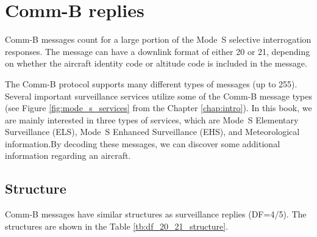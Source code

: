 \chapter{Comm-B replies} \label{chap:comm-b}

Comm-B messages count for a large portion of the Mode~S selective interrogation responses. The message can have a downlink format of either 20 or 21, depending on whether the aircraft identity code or altitude code is included in the message.

The Comm-B protocol supports many different types of messages (up to 255). Several important surveillance services utilize some of the Comm-B message types (see Figure \ref{fig:mode_s_services} from the Chapter \ref{chap:intro}). In this book, we are mainly interested in three types of services, which are Mode~S Elementary Surveillance (ELS), Mode~S Enhanced Surveillance (EHS), and Meteorological information.By decoding these messages, we can discover some additional information regarding an aircraft.


\section{Structure}

Comm-B messages have similar structures as surveillance replies (DF=4/5). The structures are shown in the Table \ref{tb:df_20_21_structure}.

